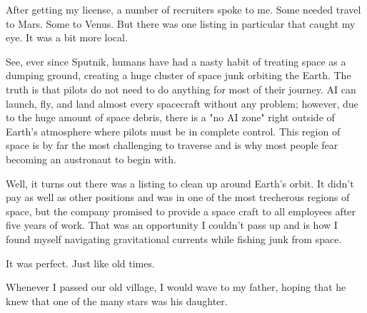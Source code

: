 After getting my license, a number of recruiters spoke to me.
Some needed travel to Mars. Some to Venus.
But there was one listing in particular that caught my eye.
It was a bit more local.

See, ever since Sputnik, humans have had a nasty habit of treating space as a dumping ground, creating a huge cluster of space junk orbiting the Earth.
The truth is that pilots do not need to do anything for most of their journey.
AI can launch, fly, and land almost every spacecraft without any problem; however, due to the huge amount of space debris, there is a "no AI zone" right outside of Earth's atmosphere where pilots must be in complete control.
This region of space is by far the most challenging to traverse and is why most people fear becoming an austronaut to begin with.

Well, it turns out there was a listing to clean up around Earth's orbit.
It didn't pay as well as other positions and was in one of the most trecherous regions of space, but the company promised to provide a space craft to all employees after five years of work.
That was an opportunity I couldn't pass up and is how I found myself navigating gravitational currents while fishing junk from space.

It was perfect.
Just like old times.

Whenever I passed our old village, I would wave to my father, hoping that he knew that one of the many stars was his daughter.
